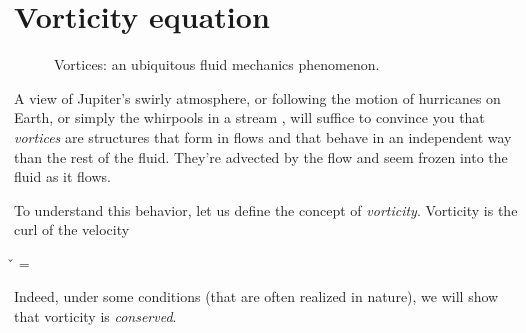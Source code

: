 
\section{Vorticity equation}

\begin{figure}
  \begin{center}
  \end{center}
  \caption[]{Vortices: an ubiquitous fluid mechanics phenomenon.}
  \label{fig:vortices}
\end{figure}

A view of Jupiter's swirly atmosphere, or following the motion of
hurricanes on Earth, or simply the whirpools in a stream , will suffice
to convince you that {\it vortices} are structures that form in flows
and that behave in an independent way than the rest of the
fluid. They're advected by the flow and seem frozen into the fluid as
it flows. 

To understand this behavior, let us define the concept of {\it
  vorticity}. Vorticity is the curl of the velocity

\beq
\v{\omega} = 
\eeq

Indeed, under some conditions (that are often realized in nature), we
will show that vorticity is {\it conserved}. 

